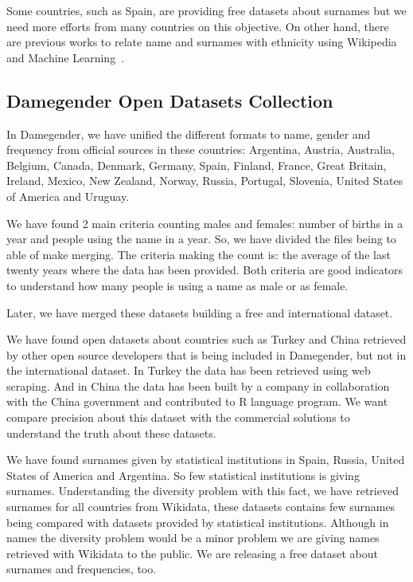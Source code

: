 \documentclass[a4paper]{article}
\begin{document}
Some countries, such as Spain, are providing free datasets about
surnames but we need more efforts from many countries on this
objective. On other hand, there are previous works to relate name and
surnames with ethnicity using Wikipedia and Machine
Learning~\cite{ambekar2009name}.

\subsection{Damegender Open Datasets Collection}
\label{sec:damegender}

In Damegender, we have unified the different formats to name, gender
and frequency from official sources in these countries: Argentina,
Austria, Australia, Belgium, Canada, Denmark, Germany, Spain, Finland,
France, Great Britain, Ireland, Mexico, New Zealand, Norway, Russia,
Portugal, Slovenia, United States of America and Uruguay.

We have found 2 main criteria counting males and females: number of
births in a year and people using the name in a year. So, we have
divided the files being to able of make merging. The criteria making
the count is: the average of the last twenty years where the data has
been provided. Both criteria are good indicators to understand how
many people is using a name as male or as female.

Later, we have merged these datasets building a free and international
dataset.

We have found open datasets about countries such as Turkey and China
retrieved by other open source developers that is being included in
Damegender, but not in the international dataset. In Turkey the data
has been retrieved using web scraping. And in China the data has been
built by a company in collaboration with the China government and
contributed to R language program. We want compare precision about
this dataset with the commercial solutions to understand the truth
about these datasets.

We have found surnames given by statistical institutions in Spain,
Russia, United States of America and Argentina. So few statistical
institutions is giving surnames. Understanding the diversity problem
with this fact, we have retrieved surnames for all countries from
Wikidata, these datasets contains few surnames being compared with
datasets provided by statistical institutions. Although in names the
diversity problem would be a minor problem we are giving names
retrieved with Wikidata to the public. We are releasing a free dataset
about surnames and frequencies, too.
\end{document}
